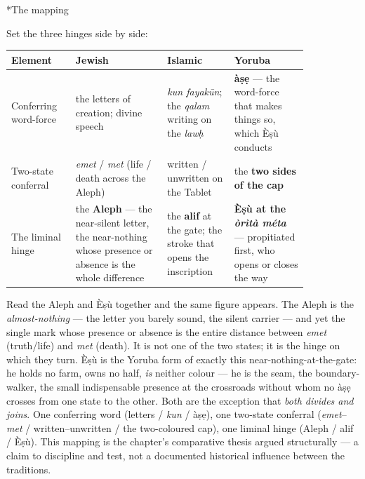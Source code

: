 \documentclass[11pt]{article}
\makeatletter
\renewcommand\paragraph{\@startsection{paragraph}{4}{\z@}{2ex plus 1ex}{0.4ex}{\normalfont\normalsize\bfseries}}
\makeatother
\begin{document}
\paragraph*{The mapping}

Set the three hinges side by side:

{\small\begin{longtable}{>{\raggedright\arraybackslash}p{0.169\linewidth}>{\raggedright\arraybackslash}p{0.263\linewidth}>{\raggedright\arraybackslash}p{0.193\linewidth}>{\raggedright\arraybackslash}p{0.215\linewidth}}
\toprule
\textbf{Element} & \textbf{Jewish} & \textbf{Islamic} & \textbf{Yoruba} \\ \midrule\endhead
Conferring word-force & the letters of creation; divine speech & \emph{kun fayakūn}; the \emph{qalam} writing on the \emph{lawḥ} & \textbf{àṣẹ} — the word-force that makes things so, which Èṣù conducts \\
Two-state conferral & \emph{emet} /\allowbreak{} \emph{met} (life /\allowbreak{} death across the Aleph) & written /\allowbreak{} unwritten on the Tablet & the \textbf{two sides of the cap} \\
The liminal hinge & the \textbf{Aleph} — the near-silent letter, the near-nothing whose presence or absence is the whole difference & the \textbf{alif} at the gate; the stroke that opens the inscription & \textbf{Èṣù at the \emph{òrìtà méta}} — propitiated first, who opens or closes the way \\
\bottomrule\end{longtable}}

Read the Aleph and Èṣù together and the same figure appears. The Aleph is the \emph{almost-nothing} — the letter you barely sound, the silent carrier — and yet the single mark whose presence or absence is the entire distance between \emph{emet} (truth/\allowbreak{}life) and \emph{met} (death). It is not one of the two states; it is the hinge on which they turn. Èṣù is the Yoruba form of exactly this near-nothing-at-the-gate: he holds no farm, owns no half, \emph{is} neither colour — he is the seam, the boundary-walker, the small indispensable presence at the crossroads without whom no àṣẹ crosses from one state to the other. Both are the exception that \emph{both divides and joins}. One conferring word (letters /\allowbreak{} \emph{kun} /\allowbreak{} àṣẹ), one two-state conferral (\emph{emet}–\emph{met} /\allowbreak{} written–unwritten /\allowbreak{} the two-coloured cap), one liminal hinge (Aleph /\allowbreak{} alif /\allowbreak{} Èṣù). This mapping is the chapter's comparative thesis argued structurally — a claim to discipline and test, not a documented historical influence between the traditions.
\end{document}
